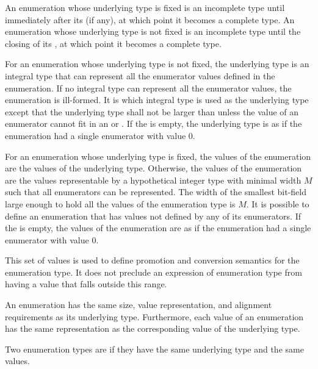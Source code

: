 \pnum
An enumeration whose underlying type is fixed is an incomplete type
until immediately after its
 (if any), at which point it becomes a complete type.
An enumeration whose underlying type is not fixed is an incomplete type
until the closing \tcode{\}} of its
, at which point it becomes a complete type.

\pnum
For an enumeration whose underlying type is not fixed,
the underlying type
is an
integral type that can represent all the enumerator values defined in
the enumeration. If no integral type can represent all the enumerator
values, the enumeration is ill-formed. It is 
which integral type is used as the underlying type
except that the underlying type shall not be larger than 
unless the value of an enumerator cannot fit in an  or
. If the  is empty, the
underlying type is as if the enumeration had a single enumerator with
value 0.

\pnum
{}%
For an enumeration whose underlying type is fixed, the values of
the enumeration are the values of the underlying type. Otherwise,
the values of the enumeration are the values representable by
a hypothetical integer type with minimal width $M$
such that all enumerators can be represented.
The width of the smallest bit-field large enough to hold all the values of the
enumeration type is $M$.
It is possible to define an enumeration that has values not defined by
any of its enumerators. If the  is empty, the
values of the enumeration are as if the enumeration had a single enumerator with
value 0.
\begin{footnote}
This set of values is used to define promotion and
conversion semantics for the enumeration type. It does not preclude an
expression of enumeration type from having a value that falls outside
this range.
\end{footnote}

\pnum
An enumeration has
the same size,
value representation, and
alignment requirements
as its underlying type.
Furthermore, each value of an enumeration has the same representation
as the corresponding value of the underlying type.

\pnum
Two enumeration types are 
if they have the same underlying type
and the same values.

